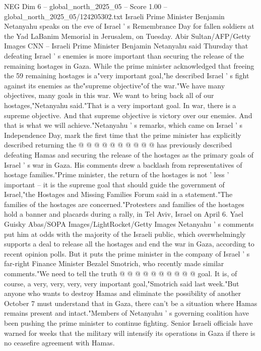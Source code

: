 \begin{textsample}{NEG Dim 6 – global\_north\_2025\_05 – Score 1.00 – global\_north\_2025\_05/124205302.txt}  \label{ex:f6_neg_380}
Israeli Prime Minister Benjamin Netanyahu speaks on the eve of Israel ' s Remembrance Day for fallen soldiers at the Yad LaBanim Memorial in Jerusalem, on Tuesday.
Abir Sultan/AFP/Getty Images CNN -- Israeli Prime Minister Benjamin Netanyahu said Thursday that defeating Israel ' s enemies is more important than securing the release of the remaining hostages in Gaza.
While the prime minister acknowledged that freeing the 59 remaining hostages is a"very important goal,"he described Israel ' s fight against its enemies as the"supreme objective"of the war."We have many objectives, many goals in this war.
We want to bring back all of our hostages,"Netanyahu said."That is a very important goal.
In war, there is a supreme objective.
And that supreme objective is victory over our enemies.
And that is what we will achieve."Netanyahu ' s remarks, which came on Israel ' s Independence Day, mark the first time that the prime minister has explicitly described returning the @ @ @ @ @ @ @ @ @ @ has previously described defeating Hamas and securing the release of the hostages as the primary goals of Israel ' s war in Gaza.
His comments drew a backlash from representatives of hostage families."Prime minister, the return of the hostages is not ' less ' important -- it is the supreme goal that should guide the government of Israel,"the Hostages and Missing Families Forum said in a statement."The families of the hostages are concerned."Protesters and families of the hostages hold a banner and placards during a rally, in Tel Aviv, Israel on April 6.
Yael Guisky Abas/SOPA Images/LightRocket/Getty Images Netanyahu ' s comments put him at odds with the majority of the Israeli public, which overwhelmingly supports a deal to release all the hostages and end the war in Gaza, according to recent opinion polls.
But it puts the prime minister in the company of Israel ' s far-right Finance Minister Bezalel Smotrich, who recently made similar comments."We need to tell the truth @ @ @ @ @ @ @ @ @ @ goal.
It is, of course, a very, very, very, very important goal,"Smotrich said last week."But anyone who wants to destroy Hamas and eliminate the possibility of another October 7 must understand that in Gaza, there can't be a situation where Hamas remains present and intact."Members of Netanyahu ' s governing coalition have been pushing the prime minister to continue fighting.
Senior Israeli officials have warned for weeks that the military will intensify its operations in Gaza if there is no ceasefire agreement with Hamas.

\end{textsample}
